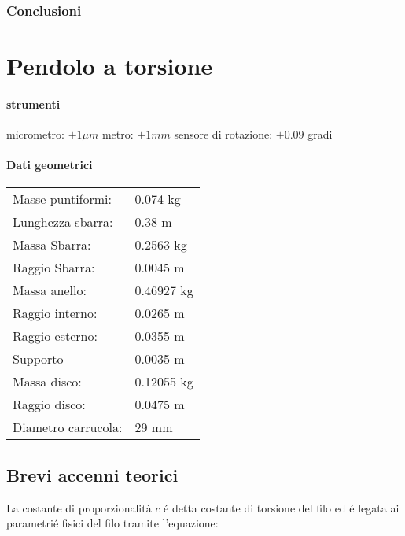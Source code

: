 \documentclass[a4paper,10pt]{report}
\begin{document}
\subsection{Conclusioni}


\chapter{Pendolo a torsione}

\subsubsection{ strumenti}
micrometro: $ \pm 1 \mu m$
metro: $\pm 1 mm$
sensore di rotazione: $\pm 0.09$ gradi

\subsubsection{Dati geometrici}
\begin{tabular}{ll}
Masse puntiformi: & 0.074 kg\\
Lunghezza sbarra: & 0.38 m\\
Massa Sbarra: & 0.2563 kg\\
Raggio Sbarra: & 0.0045 m\\

\midrule

Massa anello: & 0.46927 kg\\
Raggio interno: & 0.0265 m\\
Raggio esterno: & 0.0355 m\\

\midrule

Supporto & 0.0035 m\\

\midrule

Massa disco: & 0.12055 kg\\
Raggio disco: & 0.0475 m\\
Diametro carrucola: & 29 mm\\

\end{tabular}

\section{Brevi accenni teorici}
La costante di proporzionalità $c$ \'e detta costante di torsione del filo ed \'e legata ai parametrié fisici del filo tramite l'equazione:
\end{document}
